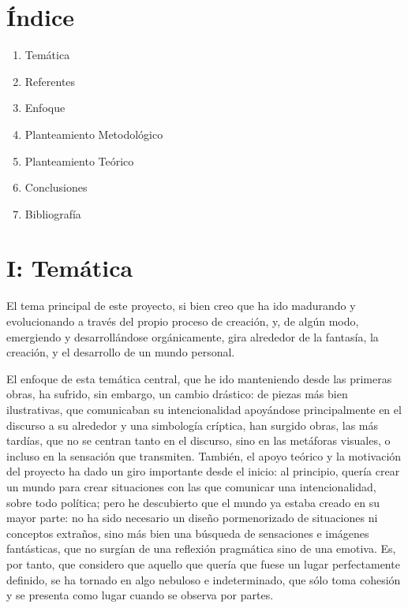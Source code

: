\hypertarget{uxedndice}{%
\section{Índice}\label{uxedndice}}

\begin{enumerate}
\def\labelenumi{\arabic{enumi}.}
\tightlist
\item
  Temática
\item
  Referentes
\item
  Enfoque
\item
  Planteamiento Metodológico
\item
  Planteamiento Teórico
\item
  Conclusiones
\item
  Bibliografía
\end{enumerate}

\hypertarget{i-temuxe1tica}{%
\section{I: Temática}\label{i-temuxe1tica}}

El tema principal de este proyecto, si bien creo que ha ido madurando y
evolucionando a través del propio proceso de creación, y, de algún modo,
emergiendo y desarrollándose orgánicamente, gira alrededor de la
fantasía, la creación, y el desarrollo de un mundo personal.

El enfoque de esta temática central, que he ido manteniendo desde las
primeras obras, ha sufrido, sin embargo, un cambio drástico: de piezas
más bien ilustrativas, que comunicaban su intencionalidad apoyándose
principalmente en el discurso a su alrededor y una simbología críptica,
han surgido obras, las más tardías, que no se centran tanto en el
discurso, sino en las metáforas visuales, o incluso en la sensación que
transmiten. También, el apoyo teórico y la motivación del proyecto ha
dado un giro importante desde el inicio: al principio, quería crear un
mundo para crear situaciones con las que comunicar una intencionalidad,
sobre todo política; pero he descubierto que el mundo ya estaba creado
en su mayor parte: no ha sido necesario un diseño pormenorizado de
situaciones ni conceptos extraños, sino más bien una búsqueda de
sensaciones e imágenes fantásticas, que no surgían de una reflexión
pragmática sino de una emotiva. Es, por tanto, que considero que aquello
que quería que fuese un lugar perfectamente definido, se ha tornado en
algo nebuloso e indeterminado, que sólo toma cohesión y se presenta como
lugar cuando se observa por partes.

